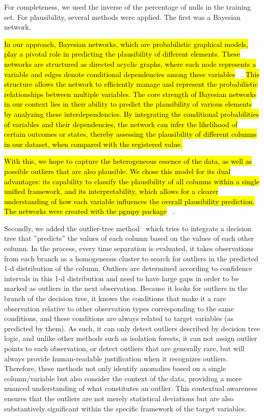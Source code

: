 For completeness, we used the inverse of the percentage of nulls in the training set. For plausibility, several methods were applied. The first was a Bayesian network. 

\hl{In our approach, Bayesian networks, which are probabilistic graphical models, play a pivotal role in predicting the plausibility of different elements. These networks are structured as directed acyclic graphs, where each node represents a variable and edges denote conditional dependencies among these variables} \unskip~\cite{pearl1988probabilistic}. \hl{This structure allows the network to efficiently manage and represent the probabilistic relationships between multiple variables. The core strength of Bayesian networks in our context lies in their ability to predict the plausibility of various elements by analyzing these interdependencies. By integrating the conditional probabilities of variables and their dependencies, the network can infer the likelihood of certain outcomes or states, thereby assessing the plausibility of different columns in our dataset, when compared with the registered value. }

\hl{With this, we hope to capture the heterogeneous essence of the data, as well as possible outliers that are also plausible. We chose this model for its dual advantages: its capability to classify the plausibility of all columns within a single unified framework, and its interpretability, which allows for a clearer understanding of how each variable influences the overall plausibility prediction. The networks were created with the pgmpy package} \unskip~\cite{pgmpy}. 

Secondly, we added the outlier-tree method\unskip~\cite{cortesExplainableOutlierDetection2020} which tries to integrate a decision tree that ''predicts'' the values of each column based on the values of each other column. In the process, every time separation is evaluated, it takes observations from each branch as a homogeneous cluster to search for outliers in the predicted 1-d distribution of the column. Outliers are determined according to confidence intervals in this 1-d distribution and need to have large gaps in order to be marked as outliers in the next observation. Because it looks for outliers in the branch of the decision tree, it knows the conditions that make it a rare observation relative to other observation types corresponding to the same conditions, and these conditions are always related to target variables (as predicted by them).  As such, it can only detect outliers described by decision tree logic, and unlike other methods such as isolation forests, it can not assign outlier points to each observation, or detect outliers that are generally rare, but will always provide human-readable justification when it recognizes outliers. Therefore, these methods not only identify anomalies based on a single column/variable but also consider the context of the data, providing a more nuanced understanding of what constitutes an outlier. This contextual awareness ensures that the outliers are not merely statistical deviations but are also substantively significant within the specific framework of the target variables. 


